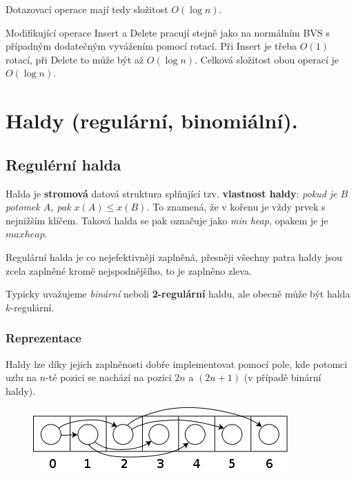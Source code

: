 \documentclass[11pt]{report} %
\numberwithin{equation}{section}
\begin{document}
Dotazovací operace mají tedy složitost $O(\log n)$.

Modifikující operace Insert a Delete pracují stejně jako na normálním BVS s případným dodatečným vyvážením pomocí rotací. Při Insert je třeba $O(1)$ rotací, při Delete to může být až $O(\log n)$. Celková složitost obou operací je $O(\log n)$.

\section{Haldy (regulární, binomiální).}
\subsection{Regulérní halda}
Halda je \textbf{stromová} datová struktura splňující tzv. \textbf{vlastnost haldy}: \textit{pokud je $B$ potomek $A$, pak $x(A) \leq x(B)$.} To znamená, že v kořenu je vždy prvek s nejnižším klíčem. Taková halda se pak označuje jako \textit{min heap}, opakem je je $max heap$. 

Regulární halda je co nejefektivněji zaplněná, přesněji všechny patra haldy jsou zcela zaplněné kromě nejspodnějšího, to je zaplněno zleva.

Typicky uvažujeme \textit{binární} neboli \textbf{2-regulární} haldu, ale obecně může být halda $k$-regulární.

\subsubsection{Reprezentace}
Haldy lze díky jejich zaplněnosti dobře implementovat pomocí pole, kde potomci uzlu na $n$-té pozici se nachází na pozici $2n$ a $(2n+1)$ (v případě binární haldy).
\begin{figure}[H]
	\centering
	\includegraphics[scale=0.6]{img/heap.png}
\end{figure}
\end{document}
